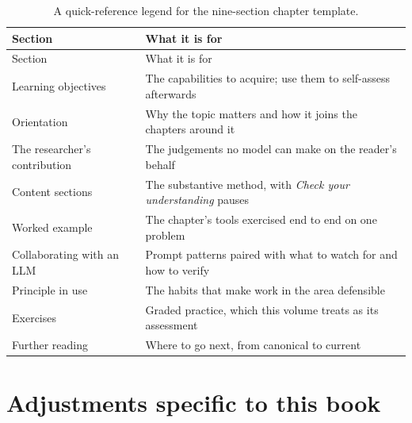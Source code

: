 \documentclass[
  letterpaper,
  11pt]{scrbook}
\begin{document}
\begin{longtable}[]{@{}
  >{\raggedright\arraybackslash}p{}
  >{\raggedright\arraybackslash}p{}@{}}
\caption{A quick-reference legend for the nine-section chapter
template.}\label{tbl-template}\tabularnewline
\toprule\noalign{}
\begin{minipage}[b]{\linewidth}\raggedright
Section
\end{minipage} & \begin{minipage}[b]{\linewidth}\raggedright
What it is for
\end{minipage} \\
\midrule\noalign{}
\endfirsthead
\toprule\noalign{}
\begin{minipage}[b]{\linewidth}\raggedright
Section
\end{minipage} & \begin{minipage}[b]{\linewidth}\raggedright
What it is for
\end{minipage} \\
\midrule\noalign{}
\endhead
\bottomrule\noalign{}
\endlastfoot
Learning objectives & The capabilities to acquire; use them to
self-assess afterwards \\
Orientation & Why the topic matters and how it joins the chapters around
it \\
The researcher's contribution & The judgements no model can make on the
reader's behalf \\
Content sections & The substantive method, with \emph{Check your
understanding} pauses \\
Worked example & The chapter's tools exercised end to end on one
problem \\
Collaborating with an LLM & Prompt patterns paired with what to watch
for and how to verify \\
Principle in use & The habits that make work in the area defensible \\
Exercises & Graded practice, which this volume treats as its
assessment \\
Further reading & Where to go next, from canonical to current \\
\end{longtable}

\section*{Adjustments specific to this
book}\label{adjustments-specific-to-this-book}
\end{document}
